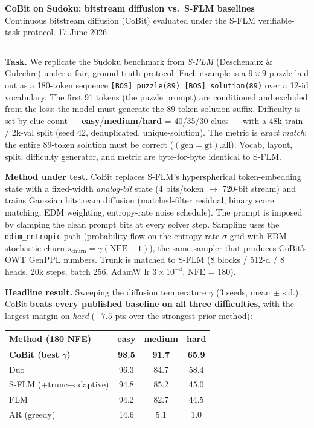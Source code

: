 \documentclass[10pt]{article}
\newcommand{\best}[1]{\textbf{\color{cobit}#1}}
\begin{document}
{\Large\bfseries CoBit on Sudoku: bitstream diffusion vs.\ S-FLM baselines}\\[2pt]
{\small Continuous bitstream diffusion (CoBit) evaluated under the S-FLM verifiable-task protocol. \hfill 17 June 2026}

\vspace{-2pt}
\hrule
\vspace{4pt}

\textbf{Task.} We replicate the Sudoku benchmark from \emph{S-FLM} (Deschenaux \& Gulcehre) under a fair,
ground-truth protocol. Each example is a $9{\times}9$ puzzle laid out as a 180-token sequence
\texttt{[BOS] puzzle(89) [BOS] solution(89)} over a 12-id vocabulary. The first 91 tokens (the puzzle prompt)
are conditioned and excluded from the loss; the model must generate the 89-token solution suffix. Difficulty is
set by clue count --- \textbf{easy}/\textbf{medium}/\textbf{hard} = 40/35/30 clues --- with a 48k-train / 2k-val
split (seed 42, deduplicated, unique-solution). The metric is \emph{exact match}: the entire 89-token solution
must be correct ($(\textrm{gen}=\textrm{gt}).\textrm{all}$). Vocab, layout, split, difficulty generator, and
metric are byte-for-byte identical to S-FLM.

\textbf{Method under test.} CoBit replaces S-FLM's hyperspherical token-embedding state with a fixed-width
\emph{analog-bit} state (4 bits/token $\rightarrow$ 720-bit stream) and trains Gaussian bitstream diffusion
(matched-filter residual, binary score matching, EDM weighting, entropy-rate noise schedule). The prompt is
imposed by clamping the clean prompt bits at every solver step. Sampling uses the \texttt{ddim\_entropic} path
(probability-flow on the entropy-rate $\sigma$-grid with EDM stochastic churn $s_{\mathrm{churn}}=\gamma(\mathrm{NFE}{-}1)$),
the same sampler that produces CoBit's OWT GenPPL numbers. Trunk is matched to S-FLM (8 blocks / 512-d / 8 heads,
20k steps, batch 256, AdamW lr $3\!\times\!10^{-4}$, NFE = 180).

\textbf{Headline result.} Sweeping the diffusion temperature $\gamma$ (3 seeds, mean $\pm$ s.d.), CoBit
\best{beats every published baseline on all three difficulties}, with the largest margin on \emph{hard}
($+7.5$ pts over the strongest prior method):

\begin{center}
\small
\begin{tabular}{l c c c}
\toprule
\textbf{Method (180 NFE)} & \textbf{easy} & \textbf{medium} & \textbf{hard} \\
\midrule
\best{CoBit (best $\gamma$)}      & \best{98.5} & \best{91.7} & \best{65.9} \\
Duo                                & 96.3 & 84.7 & 58.4 \\
S-FLM (+trunc+adaptive)            & 94.8 & 85.2 & 45.0 \\
FLM                                & 94.2 & 82.7 & 44.5 \\
AR (greedy)                        & 14.6 & \phantom{0}5.1 & \phantom{0}1.0 \\
\bottomrule
\end{tabular}
\end{center}
\end{document}
